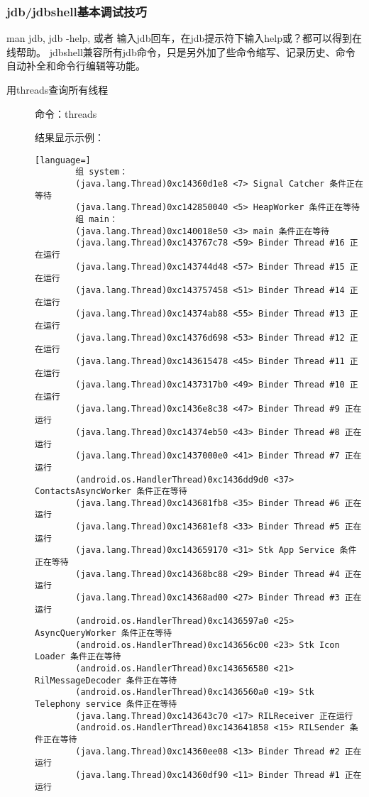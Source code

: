 \documentclass[a4paper,titlepage]{article}
\begin{document}
\subsubsection{jdb/jdbshell基本调试技巧}
man jdb, jdb -help, 或者 输入jdb回车，在jdb提示符下输入help或？都可以得到在线帮助。
jdbshell兼容所有jdb命令，只是另外加了些命令缩写、记录历史、命令自动补全和命令行编辑等功能。

\begin{description}
    \item [用threads查询所有线程]
        命令：threads

        结果显示示例：
        \begin{lstlisting}[language=]
        组 system：
        (java.lang.Thread)0xc14360d1e8 <7> Signal Catcher 条件正在等待
        (java.lang.Thread)0xc142850040 <5> HeapWorker 条件正在等待
        组 main：
        (java.lang.Thread)0xc140018e50 <3> main 条件正在等待
        (java.lang.Thread)0xc143767c78 <59> Binder Thread #16 正在运行
        (java.lang.Thread)0xc143744d48 <57> Binder Thread #15 正在运行
        (java.lang.Thread)0xc143757458 <51> Binder Thread #14 正在运行
        (java.lang.Thread)0xc14374ab88 <55> Binder Thread #13 正在运行
        (java.lang.Thread)0xc14376d698 <53> Binder Thread #12 正在运行
        (java.lang.Thread)0xc143615478 <45> Binder Thread #11 正在运行
        (java.lang.Thread)0xc1437317b0 <49> Binder Thread #10 正在运行
        (java.lang.Thread)0xc1436e8c38 <47> Binder Thread #9 正在运行
        (java.lang.Thread)0xc14374eb50 <43> Binder Thread #8 正在运行
        (java.lang.Thread)0xc1437000e0 <41> Binder Thread #7 正在运行
        (android.os.HandlerThread)0xc1436dd9d0 <37> ContactsAsyncWorker 条件正在等待
        (java.lang.Thread)0xc143681fb8 <35> Binder Thread #6 正在运行
        (java.lang.Thread)0xc143681ef8 <33> Binder Thread #5 正在运行
        (java.lang.Thread)0xc143659170 <31> Stk App Service 条件正在等待
        (java.lang.Thread)0xc14368bc88 <29> Binder Thread #4 正在运行
        (java.lang.Thread)0xc14368ad00 <27> Binder Thread #3 正在运行
        (android.os.HandlerThread)0xc1436597a0 <25> AsyncQueryWorker 条件正在等待
        (android.os.HandlerThread)0xc143656c00 <23> Stk Icon Loader 条件正在等待
        (android.os.HandlerThread)0xc143656580 <21> RilMessageDecoder 条件正在等待
        (android.os.HandlerThread)0xc1436560a0 <19> Stk Telephony service 条件正在等待
        (java.lang.Thread)0xc143643c70 <17> RILReceiver 正在运行
        (android.os.HandlerThread)0xc143641858 <15> RILSender 条件正在等待
        (java.lang.Thread)0xc14360ee08 <13> Binder Thread #2 正在运行
        (java.lang.Thread)0xc14360df90 <11> Binder Thread #1 正在运行
        \end{lstlisting}


\end{description}
\end{document}
